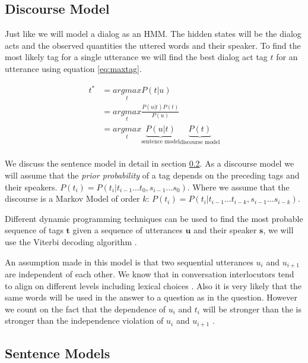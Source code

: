 \subsection{Discourse Model}

Just like  we will model a dialog as an HMM. The hidden states will be the dialog acts and the observed quantities the uttered words and their speaker. To find the most likely tag for a single utterance we will find the best dialog act tag $t$ for an utterance using equation \ref{eq:maxtag}.

\begin{equation}\label{eq:maxtag}
	\begin{align*}
	t^* &= \underset{t}{argmax} P(t|u) \\
	&=\underset{t}{argmax} \frac{P(u|t)P(t)}{P(u)}\\
	&=\underset{t}{argmax} \underbrace{P(u|t)}_{\text{sentence model}}\underbrace{P(t)}_{\text{discourse model}}\\
	\end{align*}
\end{equation}

We discuss the sentence model in detail in section \ref{sec:sentencemodel}. As a discourse model we will assume that the \emph{prior probability} of a tag depends on the preceding tags and their speakers. $P(t_i) = P(t_i|t_{i-1}...t_0, s_{i-1}...s_0)$. Where we assume that the discourse is a Markov Model of order $k$: $P(t_i) = P(t_i|t_{i-1}...t_{i-k}, s_{i-1}...s_{i-k})$.

Different dynamic programming techniques can be used to find the most probable sequence of tags $\mathbf{t}$ given a sequence of utterances $\mathbf{u}$ and their speaker $\mathbf{s}$, we will use the Viterbi decoding algorithm .

An assumption made in this model is that two sequential utterances $u_i$ and $u_{i+1}$ are independent of each other. We know that in conversation interlocutors tend to align on different levels including lexical choices . Also it is very likely that the same words will be used in the answer to a question as in the question. However we count on the fact that the dependence of $u_i$ and $t_i$ will be stronger than the is stronger than the independence violation of $u_i$ and $u_{i+1}$ .


\subsection{Sentence Models}\label{sec:sentencemodel}

